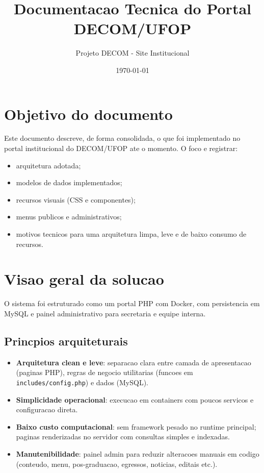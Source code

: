 \documentclass[12pt,a4paper]{article}
\title{Documentacao Tecnica do Portal DECOM/UFOP}
\author{Projeto DECOM - Site Institucional}
\date{\today}
\begin{document}
\maketitle
\tableofcontents
\newpage

\section{Objetivo do documento}
Este documento descreve, de forma consolidada, o que foi implementado no portal institucional do DECOM/UFOP ate o momento. O foco e registrar:
\begin{itemize}
    \item arquitetura adotada;
    \item modelos de dados implementados;
    \item recursos visuais (CSS e componentes);
    \item menus publicos e administrativos;
    \item motivos tecnicos para uma arquitetura limpa, leve e de baixo consumo de recursos.
\end{itemize}

\section{Visao geral da solucao}
O sistema foi estruturado como um portal PHP com Docker, com persistencia em MySQL e painel administrativo para secretaria e equipe interna.

\subsection{Princpios arquiteturais}
\begin{itemize}
    \item \textbf{Arquitetura clean e leve}: separacao clara entre camada de apresentacao (paginas PHP), regras de negocio utilitarias (funcoes em \texttt{includes/config.php}) e dados (MySQL).
    \item \textbf{Simplicidade operacional}: execucao em containers com poucos servicos e configuracao direta.
    \item \textbf{Baixo custo computacional}: sem framework pesado no runtime principal; paginas renderizadas no servidor com consultas simples e indexadas.
    \item \textbf{Manutenibilidade}: painel admin para reduzir alteracoes manuais em codigo (conteudo, menu, pos-graduacao, egressos, noticias, editais etc.).
\end{itemize}
\end{document}
